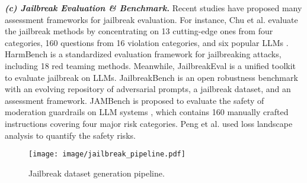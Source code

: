 \textbf{\textit{(c) Jailbreak Evaluation \& Benchmark.}} Recent studies have proposed many assessment frameworks for jailbreak evaluation. For instance, Chu et al. evaluate the jailbreak methods by concentrating on 13 cutting-edge ones from four categories, 160 questions from 16 violation categories, and six popular LLMs \cite{chu2024comprehensive}. HarmBench \cite{mazeika2024harmbenchstandardizedevaluationframework} is a standardized evaluation framework for jailbreaking attacks, including 18 red teaming methods. Meanwhile, JailbreakEval \cite{ran2024jailbreakevalintegratedtoolkitevaluating} is a unified toolkit to evaluate jailbreak on LLMs. JailbreakBench \cite{chao2024jailbreakbench} is an open robustness benchmark with an evolving repository of adversarial prompts, a jailbreak dataset, and an assessment framework. JAMBench is proposed to evaluate the safety of moderation guardrails on LLM systems \cite{jin2024jailbreaking}, which contains 160 manually crafted instructions covering four major risk categories. Peng et al. \cite{peng2024navigating}  used loss landscape analysis to quantify the safety risks. 


\begin{figure}[t]
    \centering
    \texttt{[image: image/jailbreak\_pipeline.pdf]}
    \caption{Jailbreak dataset generation pipeline.}
    \label{fig:LLM_safety_pipeline}
    \vspace{-20pt}
\end{figure}



